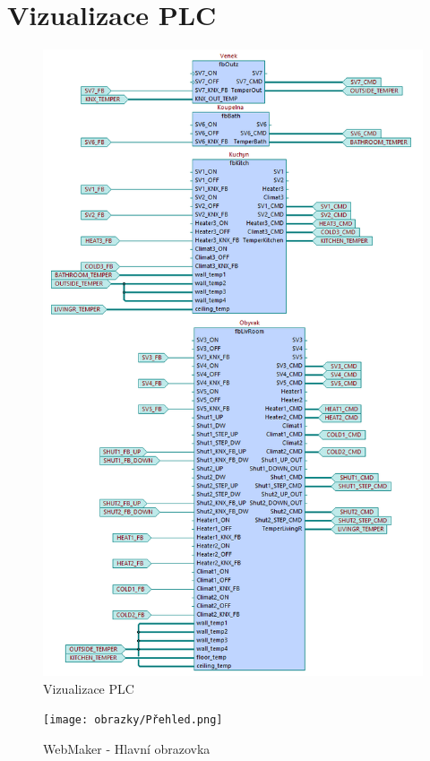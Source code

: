 \chapter{Vizualizace PLC}
\label{apend:vizualizace}
\begin{figure}[!ht]
  \begin{center}
  \includegraphics[scale=0.65]{obrazky/prgVizu.png}
  \end{center}
  \caption[Vizualizace PLC]{Vizualizace PLC}
  \label{fig:vizualizace}
\end{figure}
\begin{figure}[!ht]
  \begin{center}
  \texttt{[image: obrazky/Přehled.png]}
  \end{center}
  \caption[WebMaker - Hlavní obrazovka]{WebMaker - Hlavní obrazovka}
  \label{fig:hlavniObrazovka}
\end{figure}
